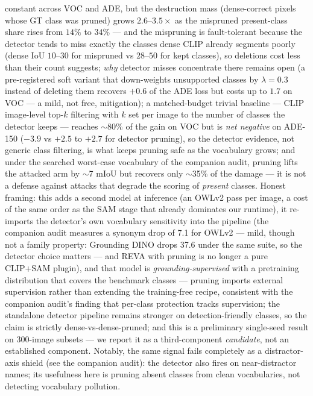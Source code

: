 \documentclass[11pt]{article}
\newcommand{\miou}{mIoU}
\newcommand{\reva}{REVA}
\begin{document}
constant across VOC and ADE, but the destruction mass (dense-correct
pixels whose GT class was pruned) grows $2.6$--$3.5\times$ as the
mispruned present-class share rises from $14\%$ to $34\%$ --- and the
mispruning is fault-tolerant because the detector tends to miss
exactly the classes dense CLIP already segments poorly (dense IoU
$10$--$30$ for mispruned vs $28$--$50$ for kept classes), so deletions
cost less than their count suggests; \emph{why} detector misses
concentrate there remains open (a pre-registered soft variant that
down-weights unsupported classes by $\lambda{=}0.3$ instead of deleting
them recovers $+0.6$ of the ADE loss but costs up to $1.7$ on VOC ---
a mild, not free, mitigation); a matched-budget trivial baseline ---
CLIP image-level top-$k$ filtering with $k$ set per image to the number
of classes the detector keeps --- reaches $\sim$80\% of the gain on VOC
but is \emph{net negative} on ADE-150 ($-3.9$ vs $+2.5$ to $+2.7$ for
detector pruning), so the detector evidence, not generic class
filtering, is what keeps pruning safe as the vocabulary grows; and
under the searched worst-case
vocabulary of the companion audit, pruning lifts the attacked arm by
$\sim$7 \miou{} but recovers only $\sim$35\% of the damage --- it is
not a defense against attacks that degrade the scoring of \emph{present}
classes. Honest framing: this adds a second
model at inference (an OWLv2 pass per image, a cost of the same order as
the SAM stage that already dominates our runtime), it re-imports the
detector's own vocabulary sensitivity into the pipeline (the companion
audit measures a synonym drop of 7.1 for OWLv2 --- mild, though not a
family property: Grounding DINO drops 37.6 under the same suite, so the
detector choice matters --- and \reva{}
with pruning is no longer a pure CLIP+SAM plugin), and that model is
\emph{grounding-supervised} with a
pretraining distribution that covers the benchmark classes --- pruning
imports external supervision rather than extending the training-free
recipe, consistent with the companion audit's finding that per-class
protection tracks supervision; the standalone detector pipeline remains
stronger on detection-friendly classes, so the claim is strictly
dense-vs-dense-pruned; and this is a preliminary single-seed result on
300-image subsets --- we report it as a third-component \emph{candidate},
not an established component. Notably, the same signal fails completely as
a distractor-axis shield (see the companion audit): the detector also fires
on near-distractor names; its usefulness here is pruning absent classes
from clean vocabularies, not detecting vocabulary pollution.
\end{document}
